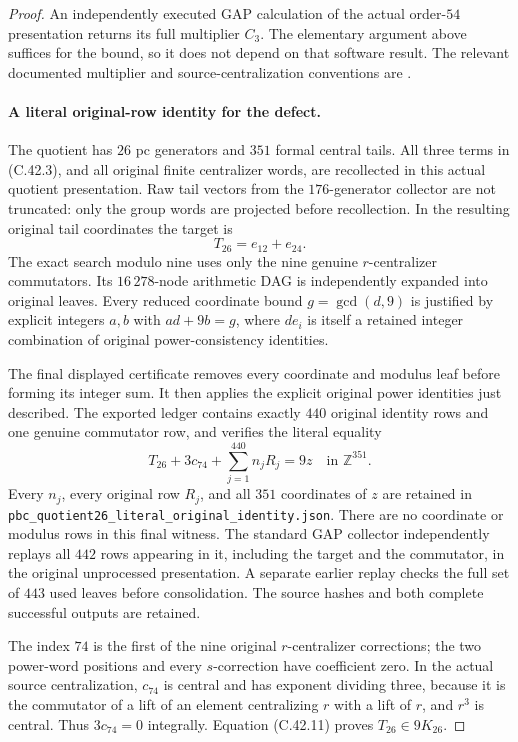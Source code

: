 \begin{proof}
An independently executed GAP calculation of the actual order-$54$
presentation returns its full multiplier $C_3$.  The elementary
argument above suffices for the bound, so it does not depend on
that software result.  The relevant documented multiplier and
source-centralization conventions are
\cite[\S7.9.2,\S7.9.4]{PBC_Polycyclic2026}.

\paragraph{A literal original-row identity for the defect.}
The quotient has $26$ pc generators and $351$ formal central tails.
All three terms in (C.42.3), and all original finite centralizer
words, are recollected in this actual quotient presentation.
Raw tail vectors from the $176$-generator collector are not
truncated: only the group words are projected before recollection.
In the resulting original tail coordinates the target is
\[
                             T_{26}=e_{12}+e_{24}.
 \tag{C.42.10}
\]
The exact search modulo nine uses only the nine genuine
$r$-centralizer commutators.  Its $16\,278$-node arithmetic DAG
is independently expanded into original leaves.  Every reduced
coordinate bound $g=\gcd(d,9)$ is justified by explicit integers
$a,b$ with $ad+9b=g$, where $d e_i$ is itself a retained integer
combination of original power-consistency identities.

The final displayed certificate removes every coordinate and
modulus leaf before forming its integer sum.  It then applies the
explicit original power identities just described.  The exported
ledger contains exactly $440$ original identity rows and one
genuine commutator row, and verifies the literal equality
\[
       T_{26}+3c_{74}+\sum_{j=1}^{440} n_j R_j
                              =9z\quad\text{in }\mathbb Z^{351}.
 \tag{C.42.11}
\]
Every $n_j$, every original row $R_j$, and all $351$ coordinates
of $z$ are retained in
\texttt{pbc\_\allowbreak{}quotient26\_\allowbreak{}literal\_\allowbreak{}original\_\allowbreak{}identity.json}.
There are no coordinate or modulus rows in this final witness.
The standard GAP collector independently replays all $442$ rows
appearing in it, including the target and the commutator, in the
original unprocessed presentation.  A separate earlier replay
checks the full set of $443$ used leaves before consolidation.
The source hashes and both complete successful outputs are retained.

The index $74$ is the first of the nine original $r$-centralizer
corrections; the two power-word positions and every $s$-correction
have coefficient zero.  In the actual source centralization,
$c_{74}$ is central and has exponent dividing three, because it
is the commutator of a lift of an element centralizing $r$ with a
lift of $r$, and $r^3$ is central.  Thus $3c_{74}=0$ integrally.
Equation (C.42.11) proves $T_{26}\in9K_{26}$.


\end{proof}

